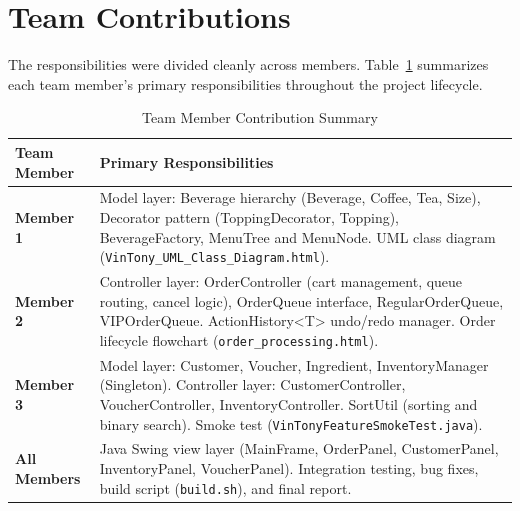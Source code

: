 \documentclass[11pt,a4paper]{article}
\begin{document}
\newpage

\section{Team Contributions}
The responsibilities were divided cleanly across members. Table~\ref{tab:contributions} summarizes each team member's primary responsibilities throughout the project lifecycle.

\begin{table}[H]
\centering
\caption{Team Member Contribution Summary}
\label{tab:contributions}
\begin{tabular}{lp{10.5cm}}
\toprule
\textbf{Team Member} & \textbf{Primary Responsibilities} \\
\midrule
\textbf{Member 1} & Model layer: Beverage hierarchy (Beverage, Coffee, Tea, Size), Decorator pattern (ToppingDecorator, Topping), BeverageFactory, MenuTree and MenuNode. UML class diagram (\texttt{VinTony\_UML\_Class\_Diagram.html}). \\
\midrule
\textbf{Member 2} & Controller layer: OrderController (cart management, queue routing, cancel logic), OrderQueue interface, RegularOrderQueue, VIPOrderQueue. ActionHistory<T> undo/redo manager. Order lifecycle flowchart (\texttt{order\_processing.html}). \\
\midrule
\textbf{Member 3} & Model layer: Customer, Voucher, Ingredient, InventoryManager (Singleton). Controller layer: CustomerController, VoucherController, InventoryController. SortUtil (sorting and binary search). Smoke test (\texttt{VinTonyFeatureSmokeTest.java}). \\
\midrule
\textbf{All Members} & Java Swing view layer (MainFrame, OrderPanel, CustomerPanel, InventoryPanel, VoucherPanel). Integration testing, bug fixes, build script (\texttt{build.sh}), and final report. \\
\bottomrule
\end{tabular}
\end{table}

\newpage

\end{document}
